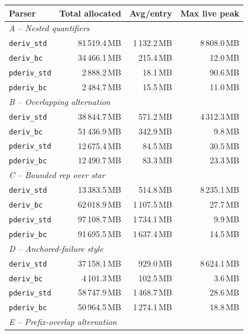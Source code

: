 \begin{table}[H]
\centering
\small
\setlength{\tabcolsep}{3pt}
\renewcommand{\arraystretch}{1.1}
\begin{tabular*}{\textwidth}{@{\extracolsep{\fill}} l rrr}
\hline
Parser & Total allocated & Avg/entry & Max live peak \\
\hline
\multicolumn{4}{l}{\textit{A -- Nested quantifiers}} \\
\texttt{deriv\_std}  & 81\,519.4\,MB & 1\,132.2\,MB & 8\,808.0\,MB \\
\texttt{deriv\_bc}   & 34\,466.1\,MB &   215.4\,MB &    12.0\,MB \\
\texttt{pderiv\_std} &  2\,888.2\,MB &    18.1\,MB &    90.6\,MB \\
\texttt{pderiv\_bc}  &  2\,484.7\,MB &    15.5\,MB &    11.0\,MB \\
\hline
\multicolumn{4}{l}{\textit{B -- Overlapping alternation}} \\
\texttt{deriv\_std}  & 38\,844.7\,MB &   571.2\,MB & 4\,312.3\,MB \\
\texttt{deriv\_bc}   & 51\,436.9\,MB &   342.9\,MB &     9.8\,MB \\
\texttt{pderiv\_std} & 12\,675.4\,MB &    84.5\,MB &    30.5\,MB \\
\texttt{pderiv\_bc}  & 12\,490.7\,MB &    83.3\,MB &    23.3\,MB \\
\hline
\multicolumn{4}{l}{\textit{C -- Bounded rep over star}} \\
\texttt{deriv\_std}  & 13\,383.5\,MB &   514.8\,MB & 8\,235.1\,MB \\
\texttt{deriv\_bc}   & 62\,018.9\,MB & 1\,107.5\,MB &    27.7\,MB \\
\texttt{pderiv\_std} & 97\,108.7\,MB & 1\,734.1\,MB &     9.9\,MB \\
\texttt{pderiv\_bc}  & 91\,695.5\,MB & 1\,637.4\,MB &    14.5\,MB \\
\hline
\multicolumn{4}{l}{\textit{D -- Anchored-failure style}} \\
\texttt{deriv\_std}  & 37\,158.1\,MB &   929.0\,MB & 8\,624.1\,MB \\
\texttt{deriv\_bc}   &  4\,101.3\,MB &   102.5\,MB &     3.6\,MB \\
\texttt{pderiv\_std} & 58\,747.9\,MB & 1\,468.7\,MB &    28.6\,MB \\
\texttt{pderiv\_bc}  & 50\,964.5\,MB & 1\,274.1\,MB &    18.8\,MB \\
\hline
\multicolumn{4}{l}{\textit{E -- Prefix-overlap alternation}} \\

\end{tabular*}
\end{table}
